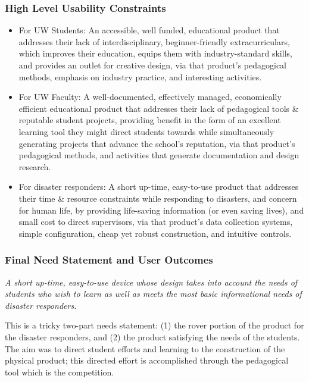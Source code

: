 \documentclass[a4paper, 10pt]{article}
\begin{document}
		\subsubsection{High Level Usability Constraints}
			\begin{itemize}
			\item 
			For UW Students: An accessible, well funded, educational product that addresses their lack of interdisciplinary, beginner-friendly extracurriculars, which improves their education, equips them with industry-standard skills, and provides an outlet for creative design, via that product's pedagogical methods, emphasis on industry practice, and interesting activities. 
		
			\item		
			For UW Faculty: A well-documented, effectively managed, economically efficient educational product that addresses their lack of pedagogical tools \& reputable student projects, providing benefit in the form of an excellent learning tool they might direct students towards while simultaneously generating projects that advance the school's reputation, via that product's pedagogical methods, and activities that generate documentation and design research. 
		
			\item
			For disaster responders: A short up-time, easy-to-use product that addresses their time \& resource constraints while responding to disasters, and concern for human life, by providing life-saving information (or even saving lives), and small cost to direct supervisors, via that product's data collection systems, simple configuration, cheap yet robust construction, and intuitive controls.	
			\end{itemize}

		\subsubsection{Final Need Statement and User Outcomes}
		\textit{A short up-time, easy-to-use device whose design takes into account the needs of students who wish to learn as well as meets the most basic informational needs of disaster responders.}
	
		This is a tricky two-part needs statement: (1) the rover portion of the product for the disaster responders, and (2) the product satisfying the needs of the students. The aim was to direct student efforts and learning to the construction of the physical product; this directed effort is accomplished through the pedagogical tool which is the competition. 
\end{document}
